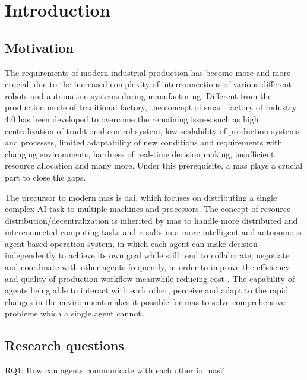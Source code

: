 \glsresetall%
\chapter{Introduction}%
\section{Motivation}
The requirements of modern industrial production has become more and more crucial, due to the increased complexity of interconnections of various different robots and automation systems during manufacturing. Different from the production mode of traditional factory, the concept of smart factory of Industry 4.0 has been developed to overcome the remaining issues such as high centralization of traditional control system, low scalability of production systems and processes, limited adaptability of new conditions and requirements with changing environments, hardness of real-time decision making, insufficient resource allocation and many more. Under this prerequisite, a \gls{mas} plays a crucial part to close the gaps. 


The precursor to modern \gls{mas} is \gls{dai}, which focuses on distributing a single complex AI task to multiple machines and processors\cite{noauthor_jacques_nodate}. The concept of resource distribution/decentralization is inherited by \gls{mas} to handle more distributed and interconnected computing tasks and results in a more intelligent and autonomous agent based operation system, in which each agent can make decision independently to achieve its own goal while still tend to collaborate, negotiate and coordinate with other agents frequently, in order to improve the efficiency and quality of production workflow meanwhile reducing cost \cite{vogel-heuser_multi-agent_2020}. The capability of agents being able to interact with each other, perceive and adapt to the rapid changes in the environment makes it possible for \gls{mas} to solve comprehensive problems which a single agent cannot. 





\section{Research questions}
RQ1: How can agents communicate with each other in \gls{mas}?


